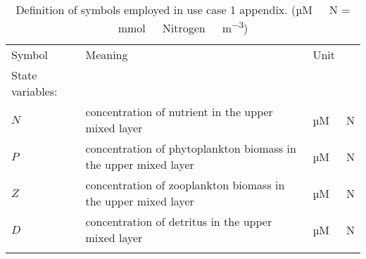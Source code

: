 \documentclass[template.tex]{subfiles}
\begin{document}
\begin{table*}[t]

\caption{ Definition of symbols employed in use case 1 appendix. (\unit{µM \ N} = \unit{mmol \ Nitrogen \ m^{-3}}) }

\begin{tabular}{l l l}
Symbol & Meaning & Unit\\
\tophline
State variables:\\
$N$ & concentration of nutrient in the upper mixed layer & \unit{µM \ N} \\
$P$ & concentration of phytoplankton biomass in the upper mixed layer & \unit{µM \ N} \\
$Z$ & concentration of zooplankton biomass in the upper mixed layer & \unit{µM \ N} \\
$D$ & concentration of detritus in the upper mixed layer & \unit{µM \ N} \\
\\


\end{tabular}
\end{table*}
\end{document}

